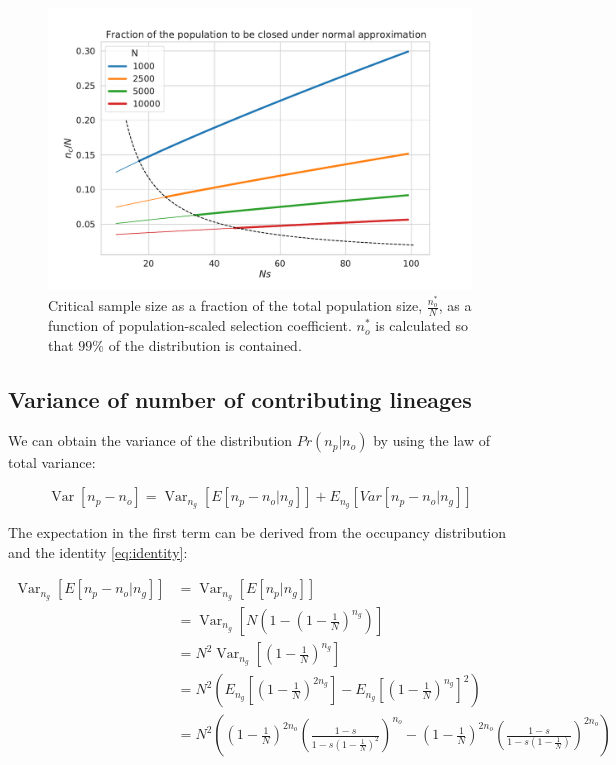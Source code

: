 \documentclass[review]{elsarticle}
\newcommand{\Var}{\operatorname{Var}}
\begin{document}
\begin{figure}
  \centering
  \includegraphics[width=\textwidth]{fig/critical_normal_fraction.pdf}
  \caption{Critical sample size as a fraction of the total population size, $\frac{n_o^*}{N}$, as a
    function of population-scaled selection coefficient. $n_o^*$ is calculated so that $99\%$ of the
    distribution is contained.}
  \label{fig:apx:critical-fraction}
\end{figure}

\subsection{Variance of number of contributing lineages}
\label{subsec:apx:variance}

We can obtain the variance of the distribution $Pr(n_p | n_o)$ by using the law of total variance:

\begin{equation}
  \label{eq:apx:var}
\Var\left[n_p-n_o \right] = \Var_{n_g}\left[E\left[n_p-n_o | n_g \right]\right]+  E_{n_g}\left[Var\left[n_p-n_o | n_g \right]\right] 
\end{equation}

The expectation in the first term can be derived from the occupancy distribution and the identity
\ref{eq:identity}:

\begin{equation}
\begin{split}
\Var_{n_g}\left[E\left[n_p-n_o | n_g \right]\right] &= \Var_{n_g}\left[E\left[n_p| n_g \right]\right] \\
&= \Var_{n_g}\left[N\left(1-(1-\frac{1}{N})^{n_g} \right) \right] \\ 
&= N^2 \Var_{n_g}\left[(1-\frac{1}{N})^{n_g} \right] \\
&= N^2 \left( E_{n_g}\left[(1-\frac{1}{N})^{2n_g} \right] - E_{n_g}\left[(1-\frac{1}{N})^{n_g} \right]^2\right) \\
&= N^2 \left( \left(1-\frac{1}{N}\right)^{2n_o} \left(\frac{1-s}{1-s  \left(1-\frac{1}{N}\right)^2}\right)^{n_o} 
-   \left(1-\frac{1}{N}\right)^{2n_o} \left(\frac{1-s}{1-s  \left(1-\frac{1}{N}\right)}\right)^{2n_o} \right) \\
\end{split}
\end{equation}
\end{document}
